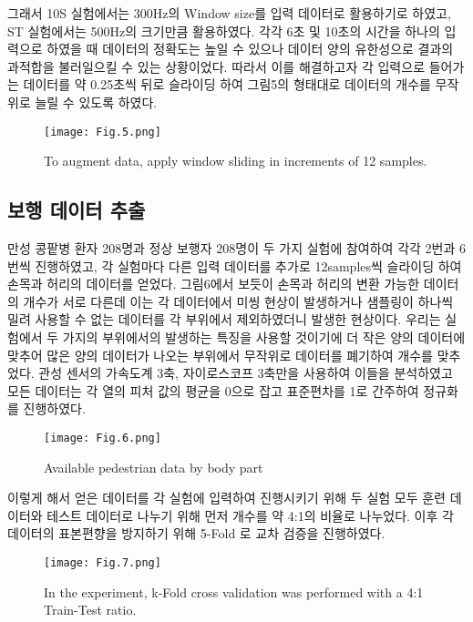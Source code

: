 \documentclass{article}
\begin{document}
그래서 10S 실험에서는 300Hz의 Window size를 입력 데이터로 활용하기로
하였고, ST 실험에서는 500Hz의 크기만큼 활용하였다. 각각 6초 및 10초의
시간을 하나의 입력으로 하였을 때 데이터의 정확도는 높일 수 있으나 데이터
양의 유한성으로 결과의 과적합을 불러일으킬 수 있는 상황이었다. 따라서
이를 해결하고자 각 입력으로 들어가는 데이터를 약 0.25초씩 뒤로 슬라이딩
하여 그림5의 형태대로 데이터의 개수를 무작위로 늘릴 수 있도록 하였다.

\begin{figure}
\centering
\texttt{[image: Fig.5.png]}
\caption{\label{Figure.5:}To augment data, apply window sliding in increments of 12 samples.}
\end{figure}

\subsection{보행 데이터 추출}

만성 콩팥병 환자 208명과 정상 보행자 208명이 두 가지 실험에 참여하여
각각 2번과 6번씩 진행하였고, 각 실험마다 다른 입력 데이터를 추가로
12samples씩 슬라이딩 하여 손목과 허리의 데이터를 얻었다. 그림6에서
보듯이 손목과 허리의 변환 가능한 데이터의 개수가 서로 다른데 이는 각
데이터에서 미씽 현상이 발생하거나 샘플링이 하나씩 밀려 사용할 수 없는
데이터를 각 부위에서 제외하였더니 발생한 현상이다. 우리는 실험에서 두
가지의 부위에서의 발생하는 특징을 사용할 것이기에 더 작은 양의 데이터에
맞추어 많은 양의 데이터가 나오는 부위에서 무작위로 데이터를 폐기하여
개수를 맞추었다. 관성 센서의 가속도계 3축, 자이로스코프 3축만을 사용하여
이들을 분석하였고 모든 데이터는 각 열의 피처 값의 평균을 0으로 잡고
표준편차를 1로 간주하여 정규화를 진행하였다.

\begin{figure}
\centering
\texttt{[image: Fig.6.png]}
\caption{\label{Figure.6:}Available pedestrian data by body part}
\end{figure}

이렇게 해서 얻은 데이터를 각 실험에 입력하여 진행시키기 위해 두 실험
모두 훈련 데이터와 테스트 데이터로 나누기 위해 먼저 개수를 약 4:1의
비율로 나누었다. 이후 각 데이터의 표본편향을 방지하기 위해 5-Fold 로
교차 검증을 진행하였다.

\begin{figure}
\centering
\texttt{[image: Fig.7.png]}
\caption{\label{Figure.7:}In the experiment, k-Fold cross validation was performed with a 4:1 Train-Test ratio.}
\end{figure}
\end{document}
